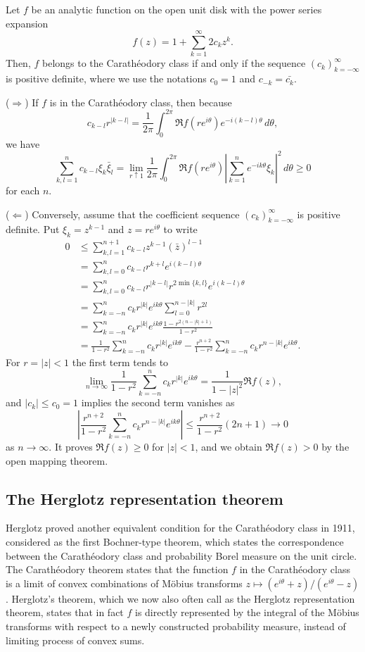 \documentclass[a4paper]{article}
\begin{document}
\begin{thm}
Let $f$ be an analytic function on the open unit disk with the power series expansion
\[f(z)=1+\sum_{k=1}^\infty2c_kz^k.\]
Then, $f$ belongs to the Carath\'eodory class if and only if the sequence $(c_k)_{k=-\infty}^\infty$ is positive definite, where we use the notations $c_0=1$ and $c_{-k}=\bar{c_k}$.
\end{thm}
\begin{pf}
($\Rightarrow$)
If $f$ is in the Carath\'eodory class, then because
\[c_{k-l}r^{|k-l|}=\frac1{2\pi}\int_0^{2\pi}\Re f(re^{i\theta})e^{-i(k-l)\theta}\,d\theta,\]
we have
\[\sum_{k,l=1}^nc_{k-l}\xi_k\bar\xi_l
=\lim_{r\uparrow1}\frac1{2\pi}\int_0^{2\pi}\Re f(re^{i\theta})\left|\sum_{k=1}^ne^{-ik\theta}\xi_k\right|^2\,d\theta\ge0\]
for each $n$.

($\Leftarrow$)
Conversely, assume that the coefficient sequence $(c_k)_{k=-\infty}^\infty$ is positive definite.
Put $\xi_k=z^{k-1}$ and $z=re^{i\theta}$ to write
\begin{align*}
0&\le\sum_{k,l=1}^{n+1}c_{k-l}z^{k-1}(\bar z)^{l-1}\\
&=\sum_{k,l=0}^nc_{k-l}r^{k+l}e^{i(k-l)\theta}\\
&=\sum_{k,l=0}^nc_{k-l}r^{|k-l|}r^{2\min\{k,l\}}e^{i(k-l)\theta}\\
&=\sum_{k=-n}^nc_kr^{|k|}e^{ik\theta}\sum_{l=0}^{n-|k|}r^{2l}\\
&=\sum_{k=-n}^nc_kr^{|k|}e^{ik\theta}\frac{1-r^{2(n-|k|+1)}}{1-r^2}\\
&=\frac1{1-r^2}\sum_{k=-n}^nc_kr^{|k|}e^{ik\theta}
-\frac{r^{n+2}}{1-r^2}\sum_{k=-n}^nc_kr^{n-|k|}e^{ik\theta}.
\end{align*}
For $r=|z|<1$ the first term tends to
\[\lim_{n\to\infty}\frac1{1-r^2}\sum_{k=-n}^nc_kr^{|k|}e^{ik\theta}=\frac1{1-|z|^2}\Re f(z),\]
and $|c_k|\le c_0=1$ implies the second term vanishes as
\[\left|\frac{r^{n+2}}{1-r^2}\sum_{k=-n}^nc_kr^{n-|k|}e^{ik\theta}\right|\le\frac{r^{n+2}}{1-r^2}(2n+1)\to0\]
as $n\to\infty$.
It proves $\Re f(z)\ge0$ for $|z|<1$, and we obtain $\Re f(z)>0$ by the open mapping theorem.
\end{pf}


\subsection{The Herglotz representation theorem}

Herglotz proved another equivalent condition for the Carath\'eodory class in 1911, considered as the first Bochner-type theorem, which states the correspondence between the Carath\'eodory class and probability Borel measure on the unit circle.
The Carath\'eodory theorem states that the function $f$ in the Carath\'eodory class is a limit of convex combinations of M\"obius transforms $z\mapsto(e^{i\theta}+z)/(e^{i\theta}-z)$.
Herglotz's theorem, which we now also often call as the Herglotz representation theorem, states that in fact $f$ is directly represented by the integral of the M\"obius transforms with respect to a newly constructed probability measure, instead of limiting process of convex sums.
\end{document}
